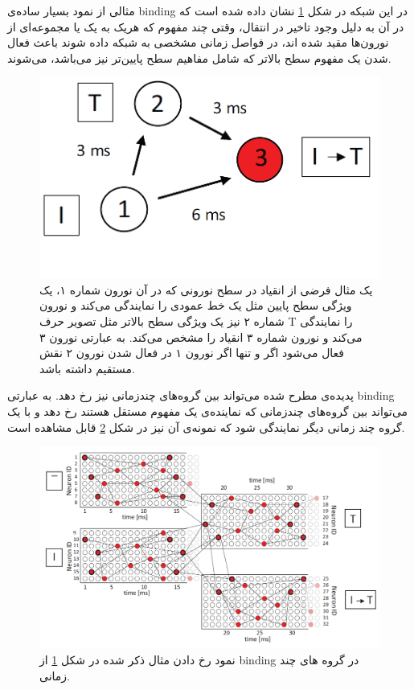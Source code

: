 \documentclass[12pt]{report}
\begin{document}
	مثالی از نمود بسیار ساده‌ی \gls{binding} در این شبکه در شکل \ref{fig:eguchi-binding} نشان داده شده است که در آن به دلیل وجود تاخیر در انتقال، وقتی چند مفهوم که هریک به یک یا مجموعه‌ای از نورون‌ها مقید شده اند، در فواصل زمانی مشخصی به شبکه داده شوند باعث فعال شدن یک مفهوم سطح بالاتر که شامل مفاهیم سطح پایین‌تر نیز می‌باشد، می‌شوند. 
	
	\begin{figure}[H]
		\centering
		\includegraphics[width=0.7\linewidth]{poly-bind.png}
		\caption[NS]{
			یک مثال فرضی از انقیاد در سطح نورونی که در آن نورون شماره ۱، یک ویژگی سطح پایین مثل یک خط عمودی را نمایندگی می‌کند و نورون شماره ۲ نیز یک ویژگی سطح بالاتر مثل تصویر حرف T را نمایندگی می‌کند و نورون شماره ۳ انقیاد را مشخص می‌کند. به عبارتی نورون ۳ فعال می‌شود اگر و تنها اگر نورون ۱ در فعال شدن نورون ۲ نقش مستقیم داشته باشد.
		}
		\label{fig:eguchi-binding}
	\end{figure}
	
	پدیده‌ی مطرح شده می‌تواند بین گروه‌های چندزمانی نیز رخ دهد. به عبارتی \gls{binding} می‌تواند بین گروه‌های چندزمانی که نماینده‌ی یک مفهوم مستقل هستند رخ دهد و با یک گروه چند زمانی دیگر نمایندگی شود که نمونه‌ی آن نیز در شکل \ref{fig:eguchi-binding-group} قابل مشاهده است.
	
	\begin{figure}[H]
		\centering
		\includegraphics[width=0.7\linewidth]{poly-group-bind.png}
		\caption[NS]{
			نمود رخ دادن مثال ذکر شده در شکل \ref{fig:eguchi-binding}  از \gls{binding} در گروه های چند زمانی.
		}
		\label{fig:eguchi-binding-group}
	\end{figure}
	
\end{document}
